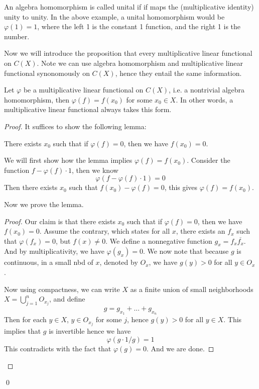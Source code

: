 An algebra homomorphism is called unital if if maps the (multiplicative identity) unity to unity. In the above example, a unital homomorphism would be $\varphi(1)=1$, where the left 1 is the constant 1 function, and the right 1 is the number.



Now we will introduce the proposition that every multiplicative linear functional on $C(X)$. Note we can use algebra homomorphism and multiplicative linear functional synonomously on $C(X)$, hence they entail the same information.
\begin{proposition}
    Let $\varphi$ be a multiplicative linear functional on $C(X)$, i.e. a nontrivial algebra homomorphism, then $\varphi(f)=f(x_0)$ for some $x_0\in X$. In other words, a multiplicative linear functional always takes this form.
\end{proposition}
\begin{proof}
    It suffices to show the following lemma: 
    \begin{lemma}
        There exists $x_0$ such that if $\varphi(f)=0$, then we have $f(x_0)=0$.
    \end{lemma}
    We will first show how the lemma implies $\varphi(f)=f(x_0)$. Consider the function $f-\varphi(f)\cdot 1$, then we know
    \begin{equation*}
        \varphi(f-\varphi(f)\cdot 1)=0
    \end{equation*}
    Then there exists $x_0$ such that $f(x_0)-\varphi(f)=0$, this gives $\varphi(f)=f(x_0)$.  

    Now we prove the lemma.
    \begin{proof}
        Our claim is that there exists $x_0$ such that if $\varphi(f)=0$, then we have $f(x_0)=0$. Assume the contrary, which states for all $x$, there exists an $f_x$ such that $\varphi(f_x)=0$, but $f(x)\neq 0$. We define a nonnegative function $g_x=f_x\overline{f_x}$. And by multiplicativity, we have $\varphi(g_x)=0$. We now note that because $g$ is continuous, in a small nbd of $x$, denoted by $O_x$, we have $g(y)>0$ for all $y\in O_x$.
        
        Now using compactness, we can write $X$ as a finite union of small neighborhoods $X=\bigcup_{j=1}^nO_{x_j}$, and define
        \begin{equation*}
            g=g_{x_1}+...+g_{x_n}
        \end{equation*}
        Then for each $y\in X$, $y\in O_{x_j}$ for some $j$, hence $g(y)>0$ for all $y\in X$. This implies that $g$ is invertible hence we have
        \begin{equation*}
            \varphi(g\cdot 1/g)=1
        \end{equation*}
        This contradicts with the fact that $\varphi(g)=0$. And we are done.
    \end{proof}
\end{proof}
\qed

